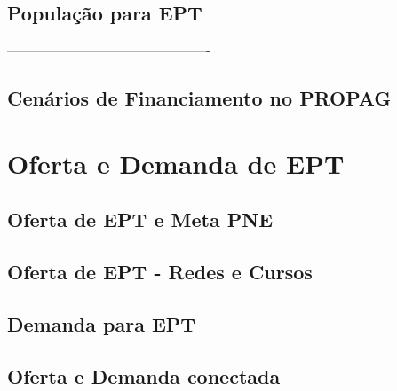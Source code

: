 \chapter{População para EPT} \label{ch:popu}


\newpage
\thispagestyle{empty}

-------------------------------------------------
\newpage
\chapter{Cenários de Financiamento no PROPAG}\label{ch:cen_fin}

\clearpage

\newpage
\thispagestyle{empty}
\mbox{}

\part{Oferta e Demanda de \hspace{-1em} EPT}

\newpage
\thispagestyle{empty}
\mbox{}


\chapter{Oferta de EPT e Meta PNE} \label{ch:metas_pne}


\newpage
\thispagestyle{empty}
\mbox{}


\chapter{Oferta de EPT - Redes e Cursos} 


\newpage
\thispagestyle{empty}
\mbox{}

\newpage
\chapter{Demanda para EPT }


\newpage
\thispagestyle{empty}
\mbox{}



\newpage
\chapter{Oferta e Demanda conectada } 

\newpage

\clearpage

